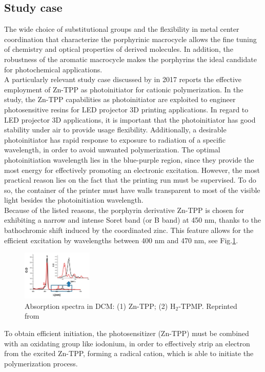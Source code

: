 \documentclass[twoside,twocolumn,9pt]{article}
\begin{document}
\subsection{Study case}
The wide choice of substitutional groups and the flexibility in metal center coordination that characterize the porphyrinic macrocycle allows the fine tuning of chemistry and optical properties of derived molecules.
In addition, the robustness of the aromatic macrocycle makes the porphyrins the ideal candidate for photochemical applications.\\
A particularly relevant study case discussed by \citet{al_mousawi_zinc_2017} in 2017 reports the effective employment of Zn-TPP as photoinitiator for cationic polymerization.
In the study, the Zn-TPP capabilities as photoinitiator are exploited to engineer photosensitive resins for LED projector 3D printing applications.
In regard to LED projector 3D applications, it is important that the photoinitiator has good stability under air to provide usage flexibility.
Additionally, a desirable photoinitiator has rapid response to exposure to radiation of a specific wavelength, in order to avoid unwanted polymerization.
The optimal photoinitiation wavelength lies in the blue-purple region, since they provide the most energy for effectively promoting an electronic excitation.
However, the most practical reason lies on the fact that the printing run must be supervised.
To do so, the container of the printer must have walls transparent to most of the visible light besides the photoinitiation wavelength.\\

Because of the listed reasons, the porphyrin derivative Zn-TPP is chosen for exhibiting a narrow and intense Soret band (or B band) at 450 nm, thanks to the bathochromic shift induced by the coordinated zinc.
This feature allows for the efficient excitation by wavelengths between 400 nm and 470 nm, see Fig.\ref{UV-Vis-Zn-TPP}.

\begin{figure}
	\centering
	\includegraphics[width=0.3\textwidth]{UV-Vis-Zn-TPP}
	\caption{Absorption spectra in DCM: (1) Zn-TPP; (2) H$_{2}$-TPMP. Reprinted from \citet{al_mousawi_zinc_2017}}
	\label{UV-Vis-Zn-TPP}
\end{figure}
To obtain efficient initiation, the photosensitizer (Zn-TPP) must be combined with an oxidating group like iodonium, in order to effectively strip an electron from the excited Zn-TPP, forming a radical cation, which is able to initiate the polymerization process.
\end{document}
